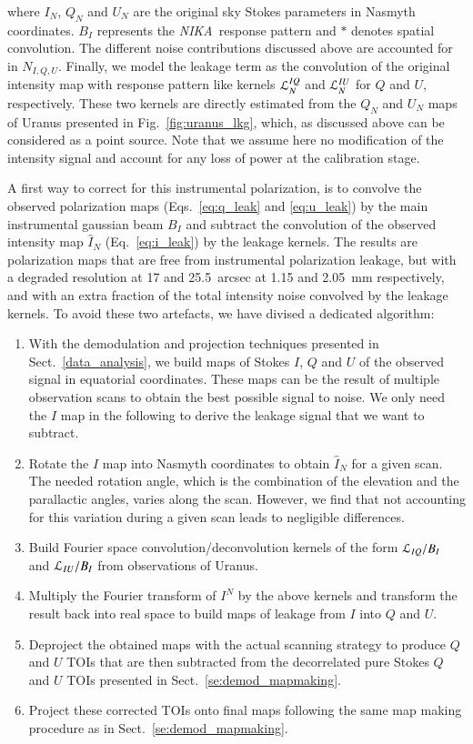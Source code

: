 \documentclass[twocolumn, traditabstract]{aa}
\newcommand{\nika}{{\it NIKA}}
\begin{document}
 where $I_{N}$, $Q_{N}$ and $U_{N}$ are the original sky Stokes parameters in
 Nasmyth coordinates. $B_{I}$ represents the \nika\ response pattern and $*$ denotes
 spatial convolution. The different noise contributions discussed above are
 accounted for in $N_{I,Q,U}$. Finally, we model the leakage term as the
 convolution of the original intensity map with response pattern like kernels
 ${\cal{L}}^{IQ}_{N}$ and ${\cal{L}}^{IU}_{N}$ for $Q$ and $U$,
 respectively. These two kernels are directly estimated from the $Q_{N}$ and
 $U_{N}$ maps of Uranus presented in Fig.~\ref{fig:uranus_lkg}, which, as
 discussed above can be considered as a point source. Note that we assume here
 no modification of the intensity signal and account for any loss of power at
 the calibration stage.

A first way to correct for this instrumental polarization, is to convolve the
observed polarization maps (Eqs.~\ref{eq:q_leak} and \ref{eq:u_leak}) by the main instrumental gaussian beam
$B_I$ and subtract the convolution of the observed intensity map $\hat{I}_N$
(Eq.~\ref{eq:i_leak}) by the leakage kernels. The results are polarization maps
that are free from instrumental polarization leakage, but with a degraded resolution at
17 and 25.5~arcsec at 1.15 and 2.05~mm respectively, and with an extra fraction
of the total intensity noise convolved by the leakage kernels. To avoid these
two artefacts, we have divised a dedicated algorithm:
 \begin{enumerate}
 \item With the demodulation and projection techniques presented in
   Sect.~\ref{data_analysis}, we build maps of Stokes $I$, $Q$ and $U$ of the
   observed signal in equatorial coordinates. These maps can be the result of
   multiple observation scans to obtain the best possible signal to
   noise. We only need the $I$ map in the following to derive the leakage signal that we want to subtract.
 \item Rotate the $I$ map into Nasmyth coordinates to obtain $\hat{I}_N$ for
   a given scan. The needed rotation angle, which is the combination of the
   elevation and the parallactic angles, varies along the scan. However, we find
   that not accounting for this variation during a given scan leads to negligible differences.
 \item Build Fourier space convolution/deconvolution kernels of the form
   ${\cal{L}}_{IQ}/B_I$ and ${\cal{L}}_{IU}/B_I$ from observations of
   Uranus.
 \item Multiply the Fourier transform of $I^N$ by the above kernels 
   and transform the result back into real space to build maps of leakage from $I$ into $Q$ and $U$.
 \item Deproject the obtained maps with the actual scanning strategy to produce $Q$ and $U$ TOIs that
  are then subtracted from the decorrelated pure Stokes $Q$ and $U$ TOIs presented in Sect.~\ref{se:demod_mapmaking}.
 \item Project these corrected TOIs onto final maps following the same map making
   procedure as in Sect.~\ref{se:demod_mapmaking}.
 \end{enumerate}
 
\end{document}
